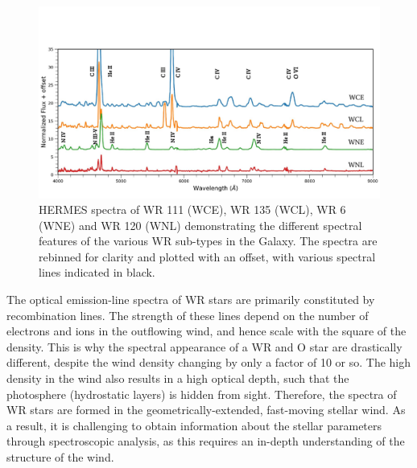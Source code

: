 \begin{figure}
    \centering
    \includegraphics[width=\textwidth]{chapters/introduction/image/Obs_SpT.pdf}
    \caption{HERMES spectra of WR 111 (WCE), WR 135 (WCL), WR 6 (WNE) and WR 120 (WNL) demonstrating the different spectral features of the various WR sub-types in the Galaxy. The spectra are rebinned for clarity and plotted with an offset, with various spectral lines indicated in black.}
    \label{fig:spectypes}
\end{figure}

The optical emission-line spectra of WR stars are primarily constituted by recombination lines. The strength of these lines depend on the number of electrons and ions in the outflowing wind, and hence scale with the square of the density. This is why the spectral appearance of a WR and O star are drastically different, despite the wind density changing by only a factor of 10 or so. The high density in the wind also results in a high optical depth, such that the photosphere (hydrostatic layers) is hidden from sight. Therefore, the spectra of WR stars are formed in the geometrically-extended, fast-moving stellar wind. As a result, it is challenging to obtain information about the stellar parameters through spectroscopic analysis, as this requires an in-depth understanding of the structure of the wind.

